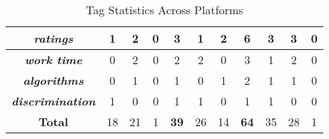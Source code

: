 \begin{table}[h!]
{\begin{tabular}{c|ccc|c|cc|c|ccc}
\textit{\textbf{ratings}} & \multicolumn{1}{c|}{1} & \multicolumn{1}{c|}{2} & 0 & 3 & \multicolumn{1}{c|}{1} & 2 & 6 & \multicolumn{1}{c|}{3} & \multicolumn{1}{c|}{3} & \multicolumn{1}{c|}{0} \\ \hline
\textit{\textbf{work time}} & \multicolumn{1}{c|}{0} & \multicolumn{1}{c|}{2} & 0 & 2 & \multicolumn{1}{c|}{2} & 0 & 3 & \multicolumn{1}{c|}{1} & \multicolumn{1}{c|}{2} & \multicolumn{1}{c|}{0} \\ \hline
\textit{\textbf{algorithms}} & \multicolumn{1}{c|}{0} & \multicolumn{1}{c|}{1} & 0 & 1 & \multicolumn{1}{c|}{0} & 1 & 2 & \multicolumn{1}{c|}{1} & \multicolumn{1}{c|}{1} & \multicolumn{1}{c|}{0} \\ \hline
\textit{\textbf{discrimination}} & \multicolumn{1}{c|}{1} & \multicolumn{1}{c|}{0} & 0 & 1 & \multicolumn{1}{c|}{1} & 0 & 1 & \multicolumn{1}{c|}{1} & \multicolumn{1}{c|}{0} & \multicolumn{1}{c|}{0} \\ \hline
\textbf{Total} & \multicolumn{1}{c|}{18} & \multicolumn{1}{c|}{21} & 1 & \textbf{39} & \multicolumn{1}{c|}{26} & 14 & \textbf{64} & \multicolumn{1}{c|}{35} & \multicolumn{1}{c|}{28} & 1
\end{tabular}
}
\caption{Tag Statistics Across Platforms}
\label{tags}
\end{table}